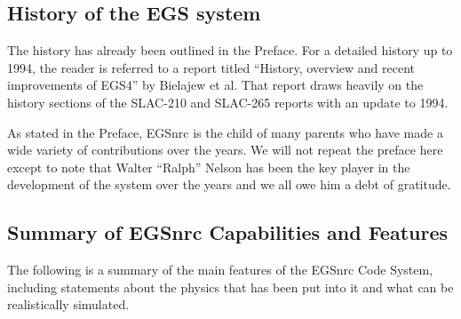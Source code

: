 \subsection{History of the EGS system}
The history has already been outlined in the Preface. For a detailed
history up to
1994, the reader is referred to a report titled  ``History, overview and
recent improvements of EGS4'' by Bielajew et al. That
report draws heavily on the history sections of the 
SLAC-210\cite{FN78} and SLAC-265\cite{Ne85} reports with an update to
1994.

As stated in the Preface, EGSnrc is the child of many parents who have
made a wide variety of contributions over the years. We will not repeat
the preface here except to note that Walter ``Ralph'' Nelson has been
the key player in the development of the system over the years and we
all owe him a debt of gratitude.


\subsection{Summary of EGSnrc Capabilities and Features}

The following is a summary of the main features of the EGSnrc
Code System, including statements about the physics that
has been put into it and what can be realistically simulated.

